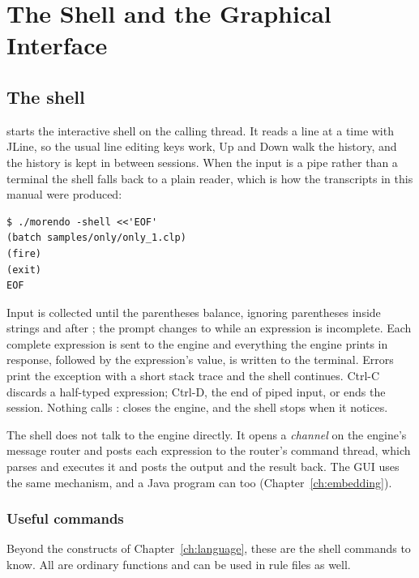 \chapter{The Shell and the Graphical Interface}
\label{ch:shell-gui}

\section{The shell}

 starts the interactive shell on the calling
thread. It reads a line at a time with JLine, so the usual line editing
keys work, Up and Down walk the history, and the history is kept in
 between sessions. When the input
is a pipe rather than a terminal the shell falls back to a plain reader,
which is how the transcripts in this manual were produced:

\begin{lstlisting}[style=shell]
$ ./morendo -shell <<'EOF'
(batch samples/only/only_1.clp)
(fire)
(exit)
EOF
\end{lstlisting}

Input is collected until the parentheses balance, ignoring parentheses
inside strings and after \fn{;;}; the prompt changes to  while an
expression is incomplete. Each complete expression is sent to the engine
and everything the engine prints in response, followed by the
expression's value, is written to the terminal. Errors print the
exception with a short stack trace and the shell continues. Ctrl-C
discards a half-typed expression; Ctrl-D, the end of piped input, or
 ends the session. Nothing calls : 
closes the engine, and the shell stops when it notices.

The shell does not talk to the engine directly. It opens a
\emph{channel} on the engine's message router and posts each expression
to the router's command thread, which parses and executes it and posts
the output and the result back. The GUI uses the same mechanism, and a
Java program can too (Chapter~\ref{ch:embedding}).

\subsection{Useful commands}

Beyond the constructs of Chapter~\ref{ch:language}, these are the shell
commands to know. All are ordinary functions and can be used in rule
files as well.

